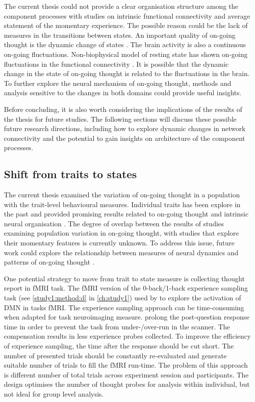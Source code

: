 The current thesis could not provide a clear organisation structure among the component processes with studies on intrinsic functional connectivity and average statement of the momentary experience. The possible reason could be the lack of measures in the transitions between states. An important quality of on-going thought is the dynamic change of states \cite{KucyiNI2017}. The brain activity is also a continuous on-going fluctuations. Non-biophysical model of resting state has shown on-going fluctuations in the functional connectivity \cite{Chang2010,Vidaurre2017}. It is possible that the dynamic change in the state of on-going thought is related to the fluctuations in the brain. To further explore the neural mechanism of on-going thought, methods and analysis sensitive to the changes in both domains could provide useful insights. 

Before concluding, it is also worth considering the implications of the results of the thesis for future studies. The following sections will discuss these possible future research directions, including how to explore dynamic changes in network connectivity and the potential to gain insights on architecture of the component processes.

\subsection{Shift from traits to states}

The current thesis examined the variation of on-going thought in a population with the trait-level behavioural measures. Individual traits has been explore in the past and provided promising results related to on-going thought \cite{Smallwood2016,McVay2009,RubyPlos2013} and intrinsic neural organisation \cite{Smith2015}. The degree of overlap between the results of studies examining population variation in on-going thought, with studies that explore their momentary features is currently unknown. To address this issue, future work could explore the relationship between measures of neural dynamics and patterns of on-going thought \cite{KucyiNI2017}. 

One potential strategy to move from trait to state measure is collecting thought report in fMRI task. The fMRI version of the 0-back/1-back experience sampling task (see \cref{study1:method:d} in \cref{ch:study1}) used by  to explore the activation of DMN in tasks fMRI. The experience sampling approach can be time-consuming when adapted for task neuroimaging measure.  prolong the post-question response time in order to prevent the task from under-/over-run in the scanner. The compensation results in less experience probes collected. To improve the efficiency of experience sampling, the time after the response should be cut short. The number of presented trials should be constantly re-evaluated and generate suitable number of trials to fill the fMRI run-time. The problem of this approach is different number of total trials across experiment session and participants. The design optimises the number of thought probes for analysis within individual, but not ideal for group level analysis.

